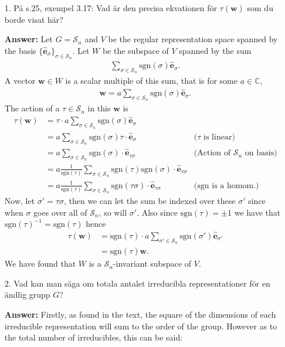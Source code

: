 \documentclass[12pt,a4paper]{article}
\theoremstyle{definition}
\theoremstyle{remark}
\numberwithin{equation}{section}
\newcommand{\CC}{\mathbb{C}}
\newcommand{\1}{\mathbf{1}}
\newcommand{\0}{\mathbf{0}}
\newcommand{\Sym}{\mathcal{S}} %
\newcommand{\sgn}{\text{sgn}}
\newcommand{\bas}{\mathbf{\hat{e}}}
\newcommand{\wvec}{\mathbf{w}}
\begin{document}
	\begin{enumerate}
		\item[1.] På s.25, exempel 3.17: Vad är den precisa ekvationen för $\tau(\wvec)$ som du borde visat här?
			
			\textbf{Answer:} Let $G = \Sym_n$ and $V$ be the regular representation space spanned by the basis $\{\bas_\sigma\}_{\sigma \in \Sym_n}$. Let $W$ be the subspace of $V$ spanned by the sum
			\begin{align*}
				\sum_{\sigma \in \Sym_n} \sgn(\sigma) \bas_\sigma.
			\end{align*}
			A vector $\wvec \in W$ is a scalar multiple of this sum, that is for some $a \in \CC$,
			\begin{align*}
				\wvec = a \sum_{\sigma \in \Sym_n} \sgn(\sigma) \bas_\sigma.
			\end{align*}
			The action of a $\tau \in \Sym_n$ in this $\wvec$ is
			\begin{align*}
				\tau(\wvec) &= \tau \cdot a \sum_{\sigma \in \Sym_n} \sgn(\sigma) \bas_\sigma \\
				&= a \sum_{\sigma \in \Sym_n} \sgn(\sigma) \tau \cdot \bas_\sigma & \text{($\tau$ is linear)} \\
				&= a \sum_{\sigma \in \Sym_n} \sgn(\sigma) \cdot \bas_{\tau\sigma} & \text{(Action of $\Sym_n$ on basis)} \\
				&= a \frac{1}{\sgn(\tau)} \sum_{\sigma \in \Sym_n} \sgn(\tau)\sgn(\sigma) \cdot \bas_{\tau\sigma} \\
				&= a \frac{1}{\sgn(\tau)} \sum_{\sigma \in \Sym_n} \sgn(\tau\sigma) \cdot \bas_{\tau\sigma} & \text{($\sgn$ is a homom.)}
			\end{align*}
			Now, let $\sigma' = \tau\sigma$, then we can let the sum be indexed over these $\sigma'$ since when $\sigma$ goes over all of $\Sym_n$, so will $\sigma'$. Also since $\sgn(\tau) = \pm 1$ we have that $\sgn(\tau)^{-1} = \sgn(\tau)$ hence
			\begin{align*}
				\tau(\wvec) &= \sgn(\tau) \cdot a \sum_{\sigma' \in \Sym_n} \sgn(\sigma') \bas_{\sigma'} \\
				&= \sgn(\tau)\wvec.
			\end{align*}
			We have found that $W$ is a $\Sym_n$-invariant subspace of $V$.
			
		\item[2.] Vad kan man säga om totala antalet irreducibla representationer för en ändlig grupp $G$?
		
			 \textbf{Answer:} Firstly, as found in the text, the square of the dimensions of each irreducible representation will sum to the order of the group. However as to the total number of irreducibles, this can be said:
			 

\end{enumerate}
\end{document}

